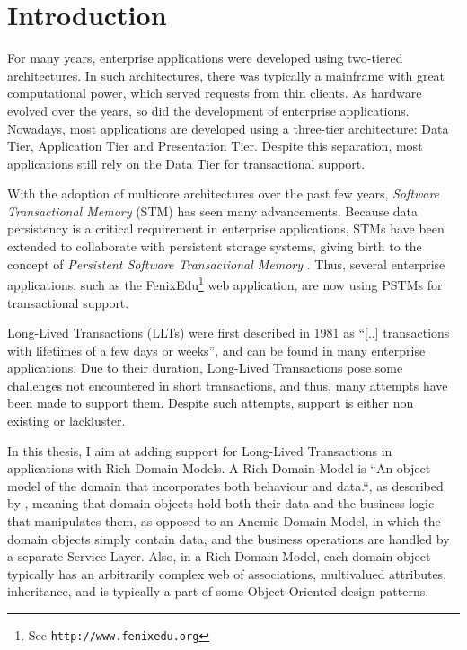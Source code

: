 \chapter{Introduction}

For many years, enterprise applications were developed using
two-tiered architectures. In such architectures, there was typically a
mainframe with great computational power, which served requests from
thin clients. As hardware evolved over the years, so did the
development of enterprise applications. Nowadays, most applications
are developed using a three-tier architecture: Data Tier, Application
Tier and Presentation Tier. Despite this separation, most applications
still rely on the Data Tier for transactional support.

With the adoption of multicore architectures over the past few years,
{\it Software Transactional Memory} (STM) has seen many advancements.
Because data persistency is a critical requirement in enterprise
applications, STMs have been extended to collaborate with persistent
storage systems, giving birth to the concept of {\it Persistent
  Software Transactional Memory} \cite{fernandes2011strict}. Thus,
several enterprise applications, such as the FenixEdu\footnote{See
  \texttt{http://www.fenixedu.org}} web application, are now using
PSTMs for transactional support.

Long-Lived Transactions (LLTs) were first described in 1981 as ``[..]
transactions with lifetimes of a few days or
weeks''\cite{gray1981transaction}, and can be found in many enterprise
applications. Due to their duration, Long-Lived Transactions pose some
challenges not encountered in short transactions, and thus, many
attempts have been made to support them. Despite such attempts,
support is either non existing or lackluster.

In this thesis, I aim at adding support for Long-Lived Transactions in
applications with Rich Domain Models.  A Rich Domain Model is ``An
object model of the domain that incorporates both behaviour and
data.``, as described by \cite{fowler2003patterns}, meaning that
domain objects hold both their data and the business logic that
manipulates them, as opposed to an Anemic Domain Model, in which the
domain objects simply contain data, and the business operations are
handled by a separate Service Layer. Also, in a Rich Domain Model,
each domain object typically has an arbitrarily complex web of
associations, multivalued attributes, inheritance, and is typically a
part of some Object-Oriented design patterns.

